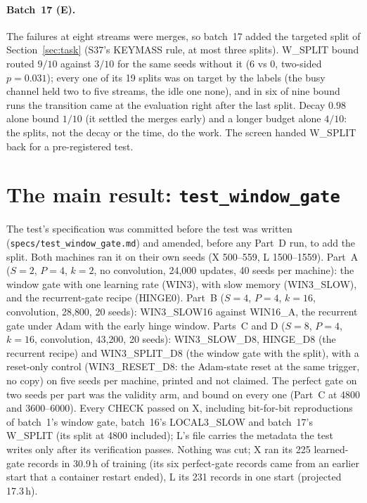 \documentclass[11pt]{article}
\newcommand{\arm}[1]{\textsf{#1}}
\begin{document}
\paragraph{Batch~17 (E).} The failures at eight streams were merges, so batch~17 added the targeted split of Section~\ref{sec:task} (S37's KEYMASS rule, at most three splits). \arm{W\_SPLIT} bound routed $9/10$ against $3/10$ for the same seeds without it (6 vs 0, two-sided $p = 0.031$); every one of its 19 splits was on target by the labels (the busy channel held two to five streams, the idle one none), and in six of nine bound runs the transition came at the evaluation right after the last split. Decay $0.98$ alone bound $1/10$ (it settled the merges early) and a longer budget alone $4/10$: the splits, not the decay or the time, do the work. The screen handed \arm{W\_SPLIT} back for a pre-registered test.

\section{The main result: \texttt{test\_window\_gate}}
\label{sec:main}

The test's specification was committed before the test was written (\texttt{specs/test\_window\_gate.md}) and amended, before any Part~D run, to add the split. Both machines ran it on their own seeds (X 500--559, L 1500--1559). Part~A ($S = 2$, $P = 4$, $k = 2$, no convolution, 24{,}000 updates, 40 seeds per machine): the window gate with one learning rate (\arm{WIN3}), with slow memory (\arm{WIN3\_SLOW}), and the recurrent-gate recipe (\arm{HINGE0}). Part~B ($S = 4$, $P = 4$, $k = 16$, convolution, 28{,}800, 20 seeds): \arm{WIN3\_SLOW16} against \arm{WIN16\_A}, the recurrent gate under Adam with the early hinge window. Parts~C and D ($S = 8$, $P = 4$, $k = 16$, convolution, 43{,}200, 20 seeds): \arm{WIN3\_SLOW\_D8}, \arm{HINGE\_D8} (the recurrent recipe) and \arm{WIN3\_SPLIT\_D8} (the window gate with the split), with a reset-only control (\arm{WIN3\_RESET\_D8}: the Adam-state reset at the same trigger, no copy) on five seeds per machine, printed and not claimed. The perfect gate on two seeds per part was the validity arm, and bound on every one (Part~C at 4800 and 3600--6000). Every CHECK passed on X, including bit-for-bit reproductions of batch~1's window gate, batch~16's \arm{LOCAL3\_SLOW} and batch~17's \arm{W\_SPLIT} (its split at 4800 included); L's file carries the metadata the test writes only after its verification passes. Nothing was cut; X ran its 225 learned-gate records in 30.9\,h of training (its six perfect-gate records came from an earlier start that a container restart ended), L its 231 records in one start (projected 17.3\,h).
\end{document}
